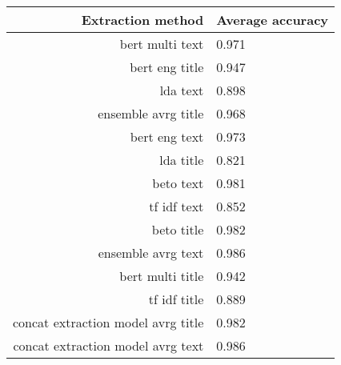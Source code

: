 \begin{tabular}{|r|l|}
  \hline
  Extraction method & Average accuracy \\ 
  \hline
  bert multi text & 0.971 \\ 
  \hline
  bert eng title & 0.947 \\ 
  \hline
  lda text & 0.898 \\ 
  \hline
  ensemble avrg title & 0.968 \\ 
  \hline
  bert eng text & 0.973 \\ 
  \hline
  lda title & 0.821 \\ 
  \hline
  beto text & 0.981 \\ 
  \hline
  tf idf text & 0.852 \\ 
  \hline
  beto title & 0.982 \\ 
  \hline
  ensemble avrg text & 0.986 \\ 
  \hline
  bert multi title & 0.942 \\ 
  \hline
  tf idf title & 0.889 \\ 
  \hline
  concat extraction model avrg title & 0.982 \\ 
  \hline
  concat extraction model avrg text & 0.986 \\ 
  \hline
\end{tabular}
